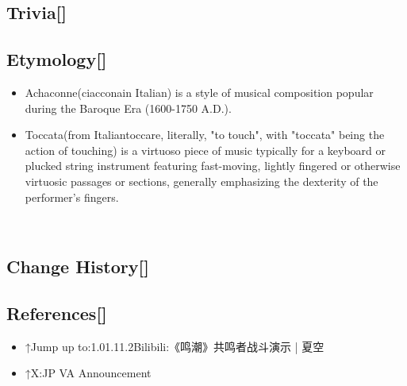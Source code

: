 \documentclass[a4paper,12pt]{article}
\begin{document}
\subsection*{Trivia[]}\n\n\subsection*{Etymology[]}\n\n\begin{itemize}
\item Achaconne(ciacconain Italian) is a style of musical composition popular during the Baroque Era (1600-1750 A.D.).
\item Toccata(from Italiantoccare, literally, "to touch", with "toccata" being the action of touching) is a virtuoso piece of music typically for a keyboard or plucked string instrument featuring fast-moving, lightly fingered or otherwise virtuosic passages or sections, generally emphasizing the dexterity of the performer's fingers.
\end{itemize}\\ \par \vspace{0.5cm}

\subsection*{Change History[]}\n\n\subsection*{References[]}\n\n\begin{itemize}
\item ↑Jump up to:1.01.11.2Bilibili:《鸣潮》共鸣者战斗演示 | 夏空
\item ↑X:JP VA Announcement
\end{itemize}\\ \par \vspace{0.5cm}
\end{document}
